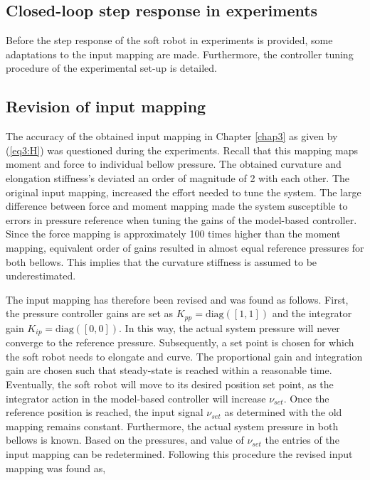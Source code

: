 \subsection*{Closed-loop step response in experiments}

Before the step response of the soft robot in experiments is provided, some adaptations to the input mapping are made. Furthermore, the controller tuning procedure of the experimental set-up is detailed. 

\subsection*{Revision of input mapping}

The accuracy of the obtained input mapping in Chapter \ref{chap3} as given by (\ref{eq3:H}) was questioned during the experiments. Recall that this mapping maps moment and force to individual bellow pressure. The obtained curvature and elongation stiffness's deviated an order of magnitude of 2 with each other. The original input mapping, increased the effort needed to tune the system. The large difference between force and moment mapping made the system susceptible to errors in pressure reference when tuning the gains of the model-based controller. Since the force mapping is approximately 100 times higher than the moment mapping, equivalent order of gains resulted in almost equal reference pressures for both bellows. This implies that the curvature stiffness is assumed to be underestimated. 

The input mapping has therefore been revised and was found as follows. First, the pressure controller gains are set as $K_{pp} =\text{diag}([1,1])$ and the integrator gain $K_{ip} = \text{diag}([0,0])$. In this way, the actual system pressure will never converge to the reference pressure. Subsequently, a set point is chosen for which the soft robot needs to elongate and curve. The proportional gain and integration gain are chosen such that steady-state is reached within a reasonable time. Eventually, the soft robot will move to its desired position set point, as the integrator action in the model-based controller will increase $\nu_{set}$. Once the reference position is reached, the input signal $\nu_{set}$ as determined with the old mapping remains constant. Furthermore, the actual system pressure in both bellows is known. Based on the pressures, and value of $\nu_{set}$ the entries of the input mapping can be redetermined. Following this procedure the revised input mapping was found as,

